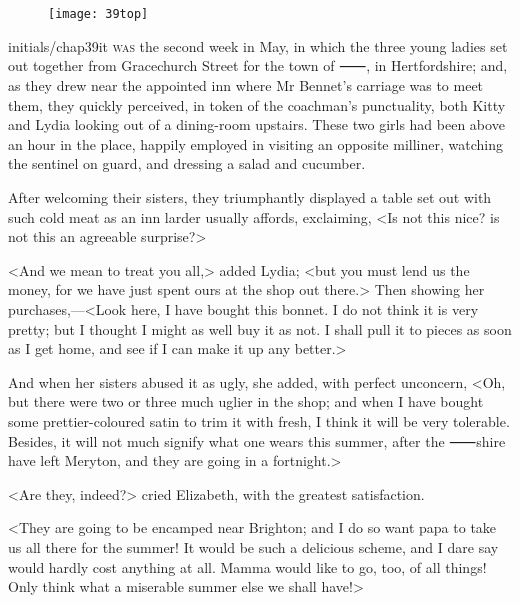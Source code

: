 \chapter[Chapter \thechapter]{}
	
\begin{figure}[t!]
\centering
\texttt{[image: 39top]}
\end{figure}


\lettrine[lines=6,image=true,findent=2pt]{initials/chap39it}{ was} the second week in May, in which the three young ladies set out together from Gracechurch Street for the town of ⸺, in Hertfordshire; and, as they drew near the appointed inn where Mr Bennet's carriage was to meet them, they quickly perceived, in token of the coachman's punctuality, both Kitty and Lydia looking out of a dining-room upstairs. These two girls had been above an hour in the place, happily employed in visiting an opposite milliner, watching the sentinel on guard, and dressing a salad and cucumber.

After welcoming their sisters, they triumphantly displayed a table set out with such cold meat as an inn larder usually affords, exclaiming, <Is not this nice? is not this an agreeable surprise?>

<And we mean to treat you all,> added Lydia; <but you must lend us the money, for we have just spent ours at the shop out there.> Then showing her purchases,—<Look here, I have bought this bonnet. I do not think it is very pretty; but I thought I might as well buy it as not. I shall pull it to pieces as soon as I get home, and see if I can make it up any better.>

And when her sisters abused it as ugly, she added, with perfect unconcern, <Oh, but there were two or three much uglier in the shop; and when I have bought some prettier-coloured satin to trim it with fresh, I think it will be very tolerable. Besides, it will not much signify what one wears this summer, after the ⸺shire have left Meryton, and they are going in a fortnight.>

<Are they, indeed?> cried Elizabeth, with the greatest satisfaction.

<They are going to be encamped near Brighton; and I do so want papa to take us all there for the summer! It would be such a delicious scheme, and I dare say would hardly cost anything at all. Mamma would like to go, too, of all things! Only think what a miserable summer else we shall have!>

